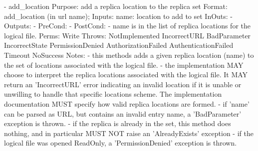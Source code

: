 \begin{myspec}
    - add_location
      Purpose:  add a replica location to the replica set
      Format:   add_location     (in  url       name);
      Inputs:   name:             location to add to set
      InOuts:   -
      Outputs:  -
      PreCond:  -
      PostCond: - name is in the list of replica locations for
                  the logical file.
      Perms:    Write
      Throws:   NotImplemented
                IncorrectURL
                BadParameter
                IncorrectState
                PermissionDenied
                AuthorizationFailed
                AuthenticationFailed
                Timeout
                NoSuccess
      Notes:    - this methods adds a given replica location 
                  (name) to the set of locations associated with 
                  the logical file.
                - the implementation MAY choose to interpret the
                  replica locations associated with the logical 
                  file.  It MAY return an 'IncorrectURL' error 
                  indicating an invalid location if it is unable 
                  or unwilling to handle that specific locations
                  scheme.  The implementation documentation MUST 
                  specify how valid replica locations are formed.
                - if 'name' can be parsed as URL, but contains 
                  an invalid entry name, a 'BadParameter'
                  exception is thrown.
                - if the replica is already in the set, this
                  method does nothing, and in particular MUST
                  NOT raise an 'AlreadyExists' exception
                - if the logical file was opened ReadOnly, a
                  'PermissionDenied' exception is thrown.
 

\end{myspec}
